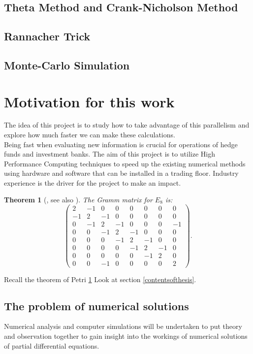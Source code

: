 \documentclass[12pt, oneside]{book}
\theoremstyle{plain}
\newtheorem{theorem}{Theorem}[section]
\theoremstyle{definition}
\begin{document}
\subsection{Theta Method and Crank-Nicholson Method}

\subsection{Rannacher Trick}

\subsection{Monte-Carlo Simulation}


\section{Motivation for this work}
The idea of this project is to study how to take advantage of this parallelism and explore how much faster we can make these calculations.
\\
Being fast when evaluating new information is crucial for operations of hedge funds and investment banks. The aim of this project is to utilize High Performance Computing techniques to speed up the existing numerical methods using hardware and software that can be installed in a trading floor. Industry experience is the driver for the project to make an impact.

\begin{theorem}[{\cite[Theorem 2.3]{Petri}, see also \cite[pg. 45]{BlackScholes}}]\label{PetriTheorem}
The Gramm matrix for $E_8$ is:
$$
\begin{pmatrix}
2	&-1&0	&0	&0	&0	&0	&0\\
-1	&2	&-1	&0	&0	&0	&0	&0\\
0	&-1	&2	&-1	&0	&0	&0	&-1\\
0	&0	&-1	&2	&-1	&0	&0	&0\\
0	&0	&0	&-1	&2	&-1	&0	&0\\
0	&0	&0	&0	&-1	&2	&-1	&0\\
0	&0	&0	&0	&0	&-1	&2	&0\\
0	&0	&-1	&0	&0	&0	&0	&2
\end{pmatrix}.
$$
\end{theorem}


Recall the theorem of Petri \ref{PetriTheorem}
Look at section \ref{contentsofthesis}.

\subsection{The problem of numerical solutions}
Numerical analysis and computer simulations will be undertaken to put theory and observation together to gain insight into the workings of numerical solutions of partial differential equations.
\end{document}
